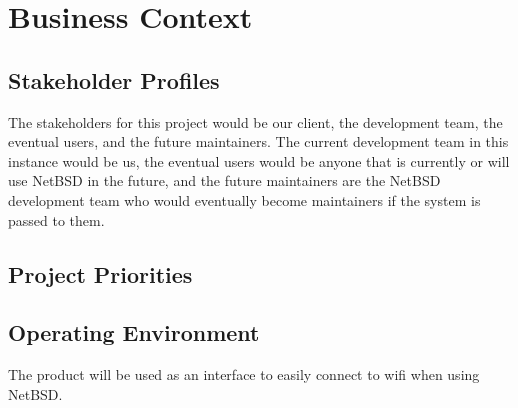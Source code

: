 \section{Business Context}

\subsection{Stakeholder Profiles}

The stakeholders for this project would be our client, the development team, the eventual users, and the future maintainers. The current development team in this instance would be us, the eventual users would be anyone that is currently or will use NetBSD in the future, and the future maintainers are the NetBSD development team who would eventually become maintainers if the system is passed to them.

\subsection{Project Priorities}



\subsection{Operating Environment}

The product will be used as an interface to easily connect to wifi when using NetBSD.
